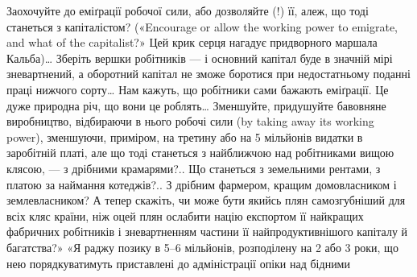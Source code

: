 Заохочуйте до еміґрації робочої сили, або дозволяйте (!)
її, алеж, що тоді станеться з капіталістом? («Encourage
or allow the working power to emigrate, and what of the capitalist?»
Цей крик серця нагадує придворного маршала Кальба)\dots{}
Зберіть вершки робітників — і основний капітал буде в значній
мірі зневартнений, а оборотний капітал не зможе боротися при
недостатньому поданні праці нижчого сорту\dots{} Нам кажуть,
що робітники сами бажають еміґрації. Це дуже природна річ,
що вони це роблять\dots{} Зменшуйте, придушуйте бавовняне виробництво,
відбираючи в нього робочі сили (by taking away its working
power), зменшуючи, приміром, на третину або на 5 мільйонів
видатки в заробітній платі, але що тоді станеться з найближчою
над робітниками вищою клясою, — з дрібними крамарями?..
Що станеться з земельними рентами, з платою за наймання котеджів?..
З дрібним фармером, кращим домовласником і землевласником?
А тепер скажіть, чи може бути якийсь плян самозгубніший
для всіх кляс країни, ніж оцей плян ослабити націю
експортом її найкращих фабричних робітників і зневартненням
частини її найпродуктивнішого капіталу й багатства?» «Я раджу
позику в 5--6 мільйонів, розподілену на 2 або 3 роки, що нею
порядкуватимуть приставлені до адміністрації опіки над бідними
\parbreak{}  %
